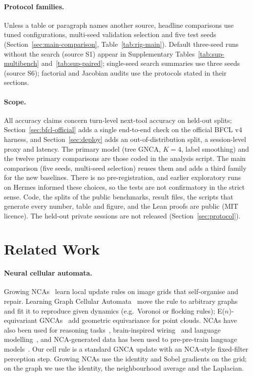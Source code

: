 \documentclass[10pt]{article}
\begin{document}
\paragraph{Protocol families.} Unless a table or paragraph names another source, headline comparisons use tuned configurations, multi-seed validation selection and five test seeds (Section~\ref{sec:main-comparison}, Table~\ref{tab:rig-main}). Default three-seed runs without the search (source S1) appear in Supplementary Tables~\ref{tab:sup-multibench} and~\ref{tab:sup-paired}; single-seed search summaries use three seeds (source S6); factorial and Jacobian audits use the protocols stated in their sections.
\paragraph{Scope.} All accuracy claims concern turn-level next-tool accuracy on held-out splits; Section~\ref{sec:bfcl-official} adds a single end-to-end check on the official BFCL v4 harness, and Section~\ref{sec:deploy} adds an out-of-distribution split, a session-level proxy and latency. The primary model (tree GNCA, $K{=}4$, label smoothing) and the twelve primary comparisons are those coded in the analysis script. The main comparison (five seeds, multi-seed selection) reuses them and adds a third family for the new baselines. There is no pre-registration, and earlier exploratory runs on Hermes informed these choices, so the tests are not confirmatory in the strict sense. Code, the splits of the public benchmarks, result files, the scripts that generate every number, table and figure, and the Lean proofs are public (MIT licence). The held-out private sessions are not released (Section~\ref{sec:protocol}).

\section{Related Work}\label{sec:related-work}
\paragraph{Neural cellular automata.} Growing NCAs~\citep{mordvintsev2020growing} learn local update rules on image grids that self-organise and repair. Learning Graph Cellular Automata~\citep{grattarola2021learning} move the rule to arbitrary graphs and fit it to reproduce given dynamics (e.g.\ Voronoi or flocking rules); E($n$)-equivariant GNCAs~\citep{gala2023equivariant} add geometric equivariance for point clouds. NCAs have also been used for reasoning tasks~\citep{etcheverry2026reasoning}, brain-inspired wiring~\citep{pio2026brainca} and language modelling~\citep{mittal2026textnca}, and NCA-generated data has been used to pre-pre-train language models~\citep{lee2026training}. Our cell rule is a standard GNCA update with an NCA-style fixed-filter perception step. Growing NCAs use the identity and Sobel gradients on the grid; on the graph we use the identity, the neighbourhood average and the Laplacian.
\end{document}
